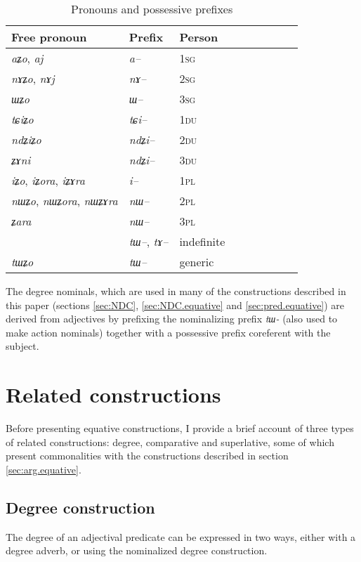 \documentclass[oneside,a4paper,11pt]{article}
\newcommand{\ipa}[1]{{\phon\textit{#1}}}
\begin{document}
\begin{table}[H] \centering
\caption{Pronouns and possessive prefixes }\label{tab:pronoun}
\begin{tabular}{lllllllll} 
\toprule
 Free pronoun & Prefix & Person\\
\midrule
 \ipa{aʑo},    \ipa{aj} &	\ipa{a--}  &		1\textsc{sg} \\
\ipa{nɤʑo},  \ipa{nɤj} &	\ipa{nɤ--}  &			2\textsc{sg}\\
\ipa{ɯʑo}  &	\ipa{ɯ--}  &			3\textsc{sg}\\
\midrule
\ipa{tɕiʑo}  &	\ipa{tɕi--}  &			1\textsc{du} \\
\ipa{ndʑiʑo}  &	\ipa{ndʑi--}  &		2\textsc{du} \\	
\ipa{ʑɤni}  &	\ipa{ndʑi--}  &		3\textsc{du} \\	
\midrule
\ipa{iʑo}, \ipa{iʑora},   \ipa{iʑɤra}   &	\ipa{i--}  &			1\textsc{pl} \\
\ipa{nɯʑo}, \ipa{nɯʑora},   \ipa{nɯʑɤra}  &	\ipa{nɯ--}  &			2\textsc{pl} \\
\ipa{ʑara}  &	\ipa{nɯ--}  &			3\textsc{pl} \\
\midrule
&  \ipa{tɯ--},  \ipa{tɤ--} & indefinite \\
\ipa{tɯʑo} & \ipa{tɯ--}   &  generic\\
\bottomrule
\end{tabular}
\end{table}

The degree nominals, which are used in many of the constructions described in this paper (sections \ref{sec:NDC}, \ref{sec:NDC.equative} and \ref{sec:pred.equative}) are derived from adjectives by prefixing the nominalizing prefix \ipa{tɯ-} (also used to make action nominals) together with a possessive prefix coreferent with the subject.

\section{Related constructions}
Before presenting equative constructions, I provide a brief account of three types of related constructions: degree, comparative and superlative, some of which present commonalities with the constructions described in section \ref{sec:arg.equative}.
 
\subsection{Degree construction}
The degree of an adjectival predicate can be expressed in two ways, either with a degree adverb, or using the nominalized degree construction.
\end{document}
